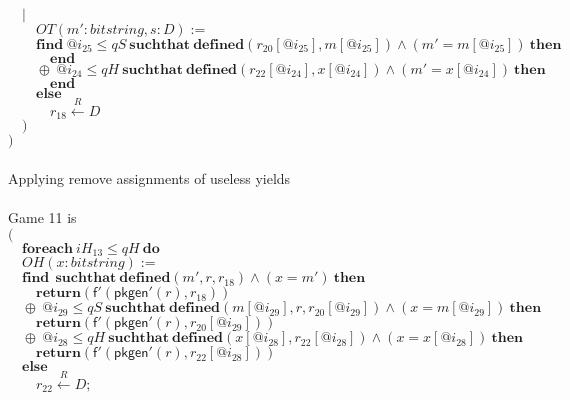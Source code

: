\documentclass{article}
\newcommand{\store}{\leftarrow}
\newcommand{\getR}{\stackrel{R}{\store}}
\newcommand{\kw}[1]{\mathbf{#1}}
\newcommand{\kwf}[1]{\mathsf{#1}}
\newcommand{\var}[1]{\mathit{#1}}
\newcommand{\kwt}[1]{\mathit{#1}}
\newcommand{\kwp}[1]{\mathit{#1}}
\begin{document}
\begin{tabbing}
$\quad |$\\
$\quad \quad OT(\var{m'}: \kwt{bitstring}, \var{s}: \kwt{D}) :=$\\
$\quad \quad \kw{find}\ \var{@i}_{25} \leq \kwp{qS}\ \kw{suchthat}\ \kw{defined}(\var{r}_{20}[\var{@i}_{25}], \var{m}[\var{@i}_{25}])\wedge (\var{m'}  =  \var{m}[\var{@i}_{25}])\ \kw{then}$\\
$\quad \quad \quad \kw{end}$\\
$\quad \quad \oplus\ \var{@i}_{24} \leq \kwp{qH}\ \kw{suchthat}\ \kw{defined}(\var{r}_{22}[\var{@i}_{24}], \var{x}[\var{@i}_{24}])\wedge (\var{m'}  =  \var{x}[\var{@i}_{24}])\ \kw{then}$\\
$\quad \quad \quad \kw{end}$\\
$\quad \quad \kw{else}$\\
$\quad \quad \quad \var{r}_{18} \getR \kwt{D}$\\
$\quad )$\\
$)$\\
$ $\\
\\
Applying remove assignments of useless yields\\
\\
Game 11 is\\
$($\\
$\quad \kw{foreach}\ \var{iH}_{13} \leq \kwp{qH}\ \kw{do}$\\
$\quad OH(\var{x}: \kwt{bitstring}) :=$\\
$\quad \kw{find}\ \ \kw{suchthat}\ \kw{defined}(\var{m'}, \var{r}, \var{r}_{18})\wedge (\var{x}  =  \var{m'})\ \kw{then}$\\
$\quad \quad \kw{return}\kwf{}(\kwf{f'}(\kwf{pkgen'}(\var{r}), \var{r}_{18}))$\\
$\quad \oplus\ \var{@i}_{29} \leq \kwp{qS}\ \kw{suchthat}\ \kw{defined}(\var{m}[\var{@i}_{29}], \var{r}, \var{r}_{20}[\var{@i}_{29}])\wedge (\var{x}  =  \var{m}[\var{@i}_{29}])\ \kw{then}$\\
$\quad \quad \kw{return}\kwf{}(\kwf{f'}(\kwf{pkgen'}(\var{r}), \var{r}_{20}[\var{@i}_{29}]))$\\
$\quad \oplus\ \var{@i}_{28} \leq \kwp{qH}\ \kw{suchthat}\ \kw{defined}(\var{x}[\var{@i}_{28}], \var{r}_{22}[\var{@i}_{28}])\wedge (\var{x}  =  \var{x}[\var{@i}_{28}])\ \kw{then}$\\
$\quad \quad \kw{return}\kwf{}(\kwf{f'}(\kwf{pkgen'}(\var{r}), \var{r}_{22}[\var{@i}_{28}]))$\\
$\quad \kw{else}$\\
$\quad \quad \var{r}_{22} \getR \kwt{D};$\\

\end{tabbing}
\end{document}
